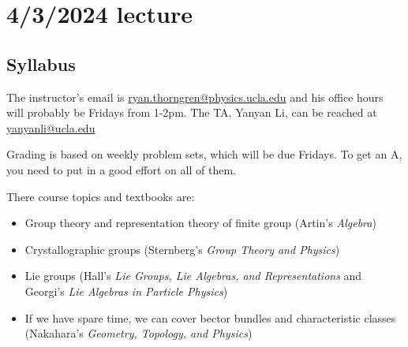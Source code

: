 \documentclass[class=article, crop=false]{standalone}
\begin{document}
\section{4/3/2024 lecture}

\subsection{Syllabus}
The instructor's email is \url{ryan.thorngren@physics.ucla.edu} and his office hours will probably be Fridays from 1-2pm. The TA, Yanyan Li, can be reached at \url{yanyanli@ucla.edu}
\par
Grading is based on weekly problem sets, which will be due Fridays. To get an A, you need to put in a good effort on all of them.
\par
There course topics and textbooks are:
\begin{itemize}
    \item Group theory and representation theory of finite group (Artin's \emph{Algebra})
    \item Crystallographic groups (Sternberg's \emph{Group Theory and Physics})
    \item Lie groups (Hall's \emph{Lie Groups, Lie Algebras, and Representations} and Georgi's \emph{Lie Algebras in Particle Physics})
    \item If we have spare time, we can cover bector bundles and characteristic classes (Nakahara's \emph{Geometry, Topology, and Physics})
\end{itemize}
\end{document}
